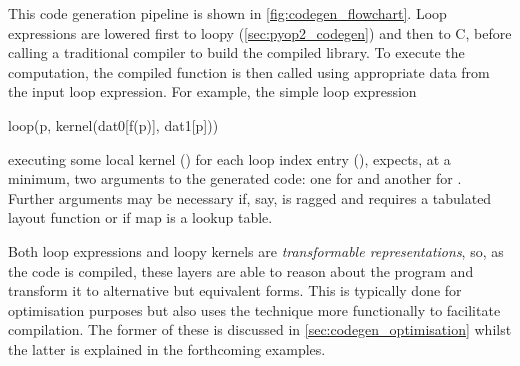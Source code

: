 \documentclass[thesis]{subfiles}
\begin{document}
This code generation pipeline is shown in \cref{fig:codegen_flowchart}.
Loop expressions are lowered first to loopy (\cref{sec:pyop2_codegen}) and then to C, before calling a traditional compiler to build the compiled library.
To execute the computation, the compiled function is then called using appropriate data from the input loop expression.
For example, the simple loop expression
\begin{pyinline}
  loop(p,
       kernel(dat0[f(p)], dat1[p]))
\end{pyinline}
\noindent
executing some local kernel () for each loop index entry (), expects, at a minimum, two arguments to the generated code: one for  and another for .
Further arguments may be necessary if, say,  is ragged and requires a tabulated layout function or if map  is a lookup table.

Both  loop expressions and loopy kernels are \emph{transformable representations}, so, as the code is compiled, these layers are able to reason about the program and transform it to alternative but equivalent forms.
This is typically done for optimisation purposes but  also uses the technique more functionally to facilitate compilation.
The former of these is discussed in \cref{sec:codegen_optimisation} whilst the latter is explained in the forthcoming examples.
\end{document}

